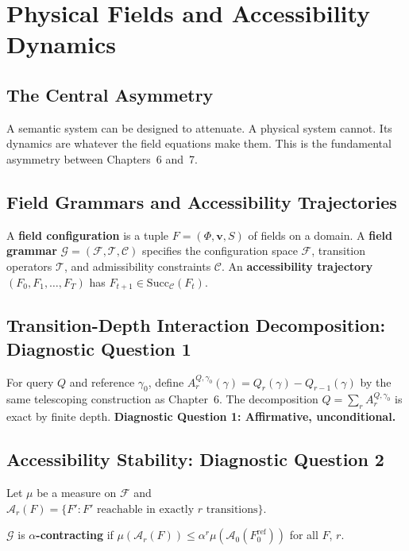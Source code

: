 \chapter{Physical Fields and Accessibility Dynamics}

\section{The Central Asymmetry}

A semantic system can be designed to attenuate. A physical system cannot. Its dynamics are whatever the field equations make them. This is the fundamental asymmetry between Chapters~6 and~7.

\section{Field Grammars and Accessibility Trajectories}

A \textbf{field configuration} is a tuple $F = (\Phi, \mathbf{v}, S)$ of fields on a domain. A \textbf{field grammar} $\mathcal{G} = (\mathcal{F}, \mathcal{T}, \mathcal{C})$ specifies the configuration space $\mathcal{F}$, transition operators $\mathcal{T}$, and admissibility constraints $\mathcal{C}$. An \textbf{accessibility trajectory} $(F_0, F_1, \ldots, F_T)$ has $F_{t+1} \in \mathrm{Succ}_\mathcal{C}(F_t)$.

\section{Transition-Depth Interaction Decomposition: Diagnostic Question 1}

For query $Q$ and reference $\gamma_0$, define $A_r^{Q,\gamma_0}(\gamma) = Q_r(\gamma) - Q_{r-1}(\gamma)$ by the same telescoping construction as Chapter~6. The decomposition $Q = \sum_r A_r^{Q,\gamma_0}$ is exact by finite depth. \textbf{Diagnostic Question 1: Affirmative, unconditional.}

\section{Accessibility Stability: Diagnostic Question 2}

Let $\mu$ be a measure on $\mathcal{F}$ and $\mathcal{A}_r(F) = \{F' : F' \text{ reachable in exactly }r\text{ transitions}\}$.

\begin{definition}
$\mathcal{G}$ is \textbf{$\alpha$-contracting} if $\mu(\mathcal{A}_r(F)) \leq \alpha^r \mu(\mathcal{A}_0(F_0^{\mathrm{ref}}))$ for all $F$, $r$.
\end{definition}

